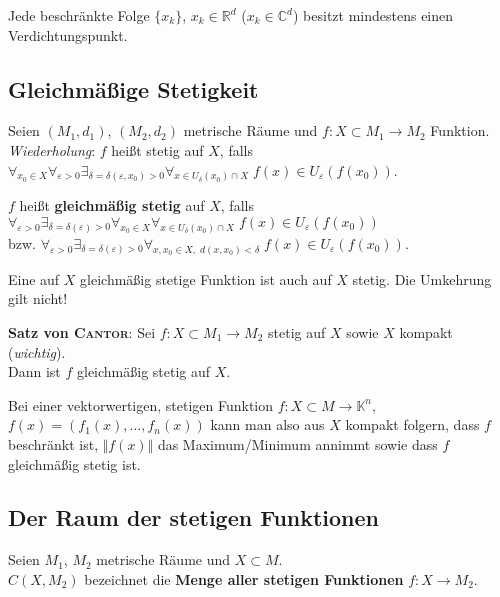 Jede beschränkte Folge $\{x_k\}$, $x_k \in \mathbb{R}^d$
($x_k \in \mathbb{C}^d$) besitzt mindestens einen Verdichtungspunkt.

\subsection{%
    Gleichmäßige Stetigkeit%
}

Seien $(M_1,d_1)$, $(M_2,d_2)$ metrische Räume und
$f: X \subset M_1 \rightarrow M_2$ Funktion. \\
\emph{Wiederholung}: $f$ heißt stetig auf $X$, falls
$\forall_{x_0 \in X} \forall_{\varepsilon > 0}
\exists_{\delta = \delta(\varepsilon, x_0) > 0}
\forall_{x \in U_\delta(x_0) \cap X}\; f(x) \in U_\varepsilon(f(x_0))$.

$f$ heißt \textbf{gleichmäßig stetig} auf $X$, falls
$\forall_{\varepsilon > 0} \exists_{\delta = \delta(\varepsilon) > 0}
\forall_{x_0 \in X} \forall_{x \in U_\delta(x_0) \cap X}\;
f(x) \in U_\varepsilon(f(x_0))$ \\
bzw. $\forall_{\varepsilon > 0} \exists_{\delta = \delta(\varepsilon) > 0}
\forall_{x, x_0 \in X,\; d(x, x_0) < \delta}\;
f(x) \in U_\varepsilon(f(x_0))$.

Eine auf $X$ gleichmäßig stetige Funktion ist auch auf $X$ stetig.
Die Umkehrung gilt nicht!

\textbf{Satz von \textsc{Cantor}}: Sei $f: X \subset M_1 \rightarrow M_2$
stetig auf $X$ sowie $X$ kompakt (\emph{wichtig}). \\
Dann ist $f$ gleichmäßig stetig auf $X$.

Bei einer vektorwertigen, stetigen Funktion
$f: X \subset M \rightarrow \mathbb{K}^n$, $f(x) = (f_1(x), \ldots, f_n(x))$
kann man also aus $X$ kompakt folgern, dass
$f$ beschränkt ist, $\Vert f(x) \Vert$ das Maximum/Minimum annimmt
sowie dass $f$ gleichmäßig stetig ist.

\pagebreak

\subsection{%
    Der Raum der stetigen Funktionen%
}

Seien $M_1$, $M_2$ metrische Räume und $X \subset M$. \\
$C(X, M_2)$ bezeichnet die \textbf{Menge aller stetigen Funktionen}
$f: X \rightarrow M_2$.

\linie

